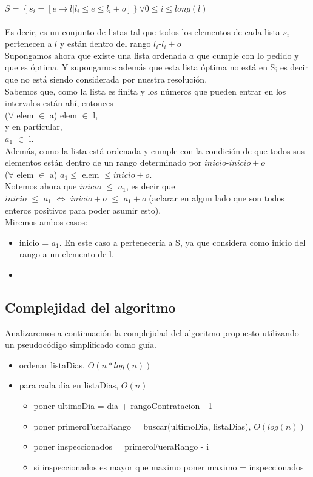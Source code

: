 $ S = \left\lbrace s_i = \left[ e \rightarrow l | l_i \leq e \leq l_i + o \right] \right\rbrace \forall 0 \leq i \leq long(l) $ \\ 
\\
Es decir, es un conjunto de listas tal que todos los elementos de cada lista $s_i$ pertenecen a $l$ y est\'an dentro del rango $l_i$-$l_i + o$ \\
Supongamos ahora que existe una lista ordenada $a$ que cumple con lo pedido y que es \'optima. Y supongamos adem\'as que esta lista \'optima no est\'a en S; es decir que no est\'a siendo considerada por nuestra resoluci\'on.\\
Sabemos que, como la lista es finita y los n\'umeros que pueden entrar en los intervalos est\'an ah\'i, entonces \\
($\forall$ elem $\in$ a) elem $\in$ l, \\
y en particular, \\
$a_1$ $\in$ l. \\
Adem\'as, como la lista est\'a ordenada y cumple con la condici\'on de que todos sus elementos est\'an dentro de un rango determinado por $inicio$-$inicio + o$\\
($\forall$ elem $\in$ a) $a_1 \leq$ elem $\leq inicio + o$.\\
Notemos ahora que $inicio$ $\leq$ $a_1$, es decir que \\ 
$inicio$ $\leq$ $a_1$ $\Leftrightarrow$ $inicio + o$ $\leq$ $a_1 + o$
(aclarar en algun lado que son todos enteros positivos para poder asumir esto).\\
Miremos ambos casos:
\begin{itemize}
\item inicio = $a_1$. En este caso a pertenecer\'ia a S, ya que considera como inicio del rango a un elemento de l.
\item 
\end{itemize}

\subsection{Complejidad del algoritmo}

Analizaremos a continuaci\'on la complejidad del algoritmo propuesto utilizando un pseudoc\'odigo simplificado como gu\'ia.

\begin{itemize}
\item ordenar listaDias, $O(n*log(n))$
\item para cada dia en listaDias, $O(n)$
\begin{itemize}
	\item poner ultimoDia = dia + rangoContratacion - 1
	\item poner primeroFueraRango = buscar(ultimoDia, listaDias), $O(log(n))$
	\item poner inspeccionados = primeroFueraRango - i
	\item si inspeccionados es mayor que maximo poner maximo = inspeccionados
\end{itemize}
\end{itemize}

